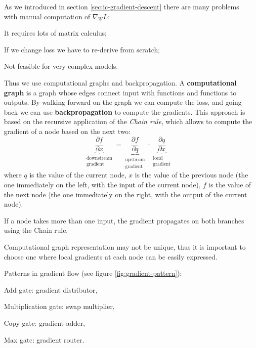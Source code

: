 As we introduced in section \ref{sec:ic-gradient-descent} there are many problems with manual computation of $\nabla_W L$:
\begin{myitem}
    \item It requires lots of matrix calculus;
    \item If we change loss we have to re-derive from scratch;
    \item Not feasible for very complex models.
\end{myitem}
Thus we use computational graphs and backpropagation. A \textbf{computational graph} is a graph whose edges connect input with functions and functions to outputs. By walking forward on the graph we can compute the loss, and going back we can use \textbf{backpropagation} to compute the gradients. This approach is based on the recursive application of the \textit{Chain rule}, which allows to compute the gradient of a node based on the next two:
\begin{equation}\label{eq:chain-rule}
    \underbrace{\frac{\partial f}{\partial x}}_{\substack{\text{downstream} \\ \text{gradient}}} =
    \underbrace{\frac{\partial f}{\partial q}}_{\substack{\text{upstream} \\ \text{gradient}}} \cdot
    \underbrace{\frac{\partial q}{\partial x}}_{\substack{\text{local} \\ \text{gradient}}}
\end{equation}
where $q$ is the value of the current node, $x$ is the value of the previous node (the one immediately on the left, with the input of the current node), $f$ is the value of the next node (the one immediately on the right, with the output of the current node).

\obs If a node takes more than one input, the gradient propagates on both branches using the Chain rule.

\obs Computational graph representation may not be unique, thus it is important to choose one where local gradients at each node can be easily
expressed.

Patterns in gradient flow (see figure \ref{fig:gradient-pattern}):
\begin{myitem}
    \item Add gate: gradient distributor,
    \item Multiplication gate: swap multiplier,
    \item Copy gate: gradient adder,
    \item Max gate: gradient router.
\end{myitem}

